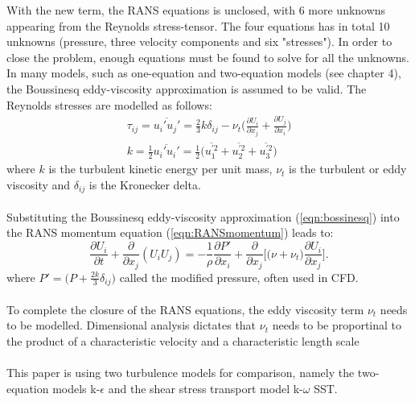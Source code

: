 \documentclass[a4paper, 12pt]{report}
\begin{document}
With the new term, the RANS equations is unclosed, with 6 more unknowns appearing from the Reynolds stress-tensor. The four equations has in total 10 unknowns (pressure, three velocity components and six "stresses"). In order to close the problem, enough equations must be found to solve for all the unknowns. In many models, such as one-equation and two-equation models (see \citep{Wilcox} chapter 4), the Boussinesq eddy-viscosity approximation \citep{CFD} is assumed to be valid. The Reynolds stresses are modelled as follows:
\begin{eqnarray}
\label{eqn:bossinesq}
\tau_{ij} = \overline{u_i'u_j'} = \frac{2}{3}k\delta_{ij} - \nu_t\big(\frac{\partial U_i}{\partial x_j} + \frac{\partial U_j}{\partial x_i}\big)\\
\label{eqn:TurbKineticEnergy}
k = \frac{1}{2}\overline{u_i' u_i'} = \frac{1}{2}\big(\overline{u_1^{'2}} + \overline{u_2^{'2}} + \overline{u_3^{'2}} \big)
\end{eqnarray}
where $k$ is the turbulent kinetic energy per unit mass, $\nu_t$ is the turbulent or eddy viscosity and $\delta_{ij}$ is the Kronecker  delta.\\
\\
Substituting the Boussinesq eddy-viscosity approximation (\ref{eqn:bossinesq}) into the RANS momentum equation (\ref{eqn:RANSmomentum}) leads to:
\begin{equation}
\frac{\partial U_i}{\partial t} +  \frac{\partial}{\partial x_j}(U_i U_j) = -\frac{1}{\rho} \frac{\partial P'}{\partial x_i} +  \frac{\partial}{\partial x_j}\Big[ \big(\nu + \nu_t\big) \frac{\partial U_i}{\partial x_j}\Big].
\end{equation}
where $P' = \big(P + \frac{2k}{3}\delta_{ij} \big)$ called the modified pressure\cite{Pope}, often used in CFD.\\
\\
To complete the closure of the RANS equations, the eddy viscosity term $\nu_t$ needs to be modelled. Dimensional analysis dictates that $\nu_t$ needs to be proportinal to the product of a characteristic velocity and a characteristic length scale \cite{Wilcox,AppliedMathematicalModelling}\\
\\
This paper is using two turbulence models for comparison, namely the two-equation models k-$\epsilon$ and the shear stress transport model k-$\omega$ SST.
\end{document}
